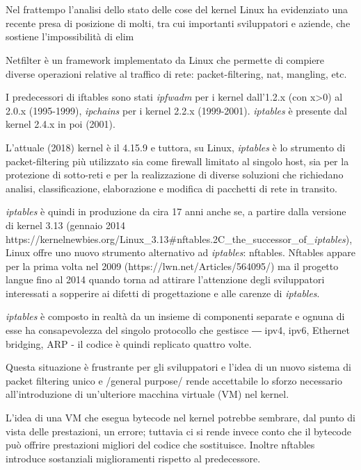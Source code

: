 \chapter{}
Nel frattempo l'analisi dello stato delle cose del kernel Linux ha evidenziato
una recente presa di posizione di molti, tra cui importanti sviluppatori e
aziende, che sostiene l'impossibilit\`a di elim

Netfilter è un framework implementato da Linux che permette di
compiere diverse operazioni relative al traffico di rete: packet-filtering,
nat, mangling, etc.

I predecessori di iftables sono stati {\em ipfwadm} per i kernel dall'1.2.x (con x>0)
al 2.0.x (1995-1999), {\em ipchains} per i kernel 2.2.x (1999-2001).  {\em iptables} è
presente dal kernel 2.4.x in poi (2001).

L'attuale (2018) kernel è il 4.15.9 e tuttora, su Linux, {\em iptables} è lo
strumento di packet-filtering più utilizzato sia come firewall limitato al
singolo host, sia per la protezione di sotto-reti e per la realizzazione di
diverse soluzioni che richiedano analisi, classificazione, elaborazione e
modifica di pacchetti di rete in transito.

{\em iptables} è quindi in produzione da cira 17 anni anche se, a partire dalla
versione di kernel 3.13 (gennaio 2014
https://kernelnewbies.org/Linux\_3.13\#nftables.2C\_the\_successor\_of\_{\em iptables}),
Linux offre uno nuovo strumento alternativo ad {\em iptables}: nftables. Nftables
appare per la prima volta nel 2009 (https://lwn.net/Articles/564095/) ma il
progetto langue fino al 2014 quando torna ad attirare l'attenzione degli
sviluppatori interessati a sopperire ai difetti di progettazione e alle carenze
di {\em iptables}.

{\em iptables} è composto in realtà da un insieme di componenti separate e ognuna di
esse ha consapevolezza del singolo protocollo che gestisce ― ipv4, ipv6,
Ethernet bridging, ARP - il codice è quindi replicato quattro volte.

Questa situazione è frustrante per gli sviluppatori e l'idea di un nuovo
sistema di packet filtering unico e /general purpose/ rende accettabile lo
sforzo necessario all'introduzione di un'ulteriore macchina virtuale (VM) nel
kernel.

L'idea di una VM che esegua bytecode nel kernel potrebbe sembrare, dal punto di
vista delle prestazioni, un errore; tuttavia ci si rende invece conto che il
bytecode può offrire prestazioni migliori del codice che sostituisce.  Inoltre
nftables introduce sostanziali miglioramenti rispetto al predecessore.

